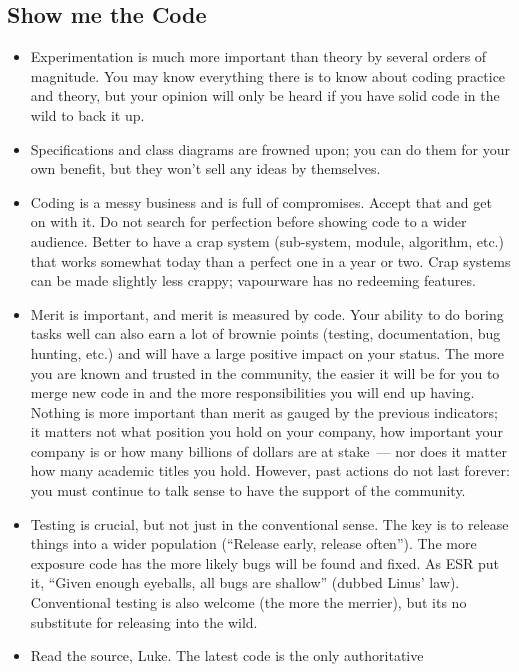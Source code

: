 \documentclass{memoir}
\begin{document}
\subsection{Show me the Code}

\begin{itemize}
\item Experimentation is much more important than theory by several
  orders of magnitude. You may know everything there is to know about
  coding practice and theory, but your opinion will only be heard if
  you have solid code in the wild to back it up.
\item Specifications and class diagrams are frowned upon; you can do
  them for your own benefit, but they won't sell any ideas by
  themselves.
\item Coding is a messy business and is full of compromises. Accept
  that and get on with it. Do not search for perfection before showing
  code to a wider audience. Better to have a crap system (sub-system,
  module, algorithm, etc.) that works somewhat today than a perfect
  one in a year or two. Crap systems can be made slightly less crappy;
  vapourware has no redeeming features.
\item Merit is important, and merit is measured by code. Your ability
  to do boring tasks well can also earn a lot of brownie points
  (testing, documentation, bug hunting, etc.) and will have a large
  positive impact on your status. The more you are known and trusted
  in the community, the easier it will be for you to merge new code in
  and the more responsibilities you will end up having. Nothing is
  more important than merit as gauged by the previous indicators; it
  matters not what position you hold on your company, how important
  your company is or how many billions of dollars are at stake~--- nor
  does it matter how many academic titles you hold. However, past
  actions do not last forever: you must continue to talk sense to have
  the support of the community.
\item Testing is crucial, but not just in the conventional sense. The
  key is to release things into a wider population (``Release early,
  release often''). The more exposure code has the more likely bugs
  will be found and fixed. As ESR put it, ``Given enough eyeballs, all
  bugs are shallow'' (dubbed Linus' law). Conventional testing is also
  welcome (the more the merrier), but its no substitute for releasing
  into the wild.
\item Read the source, Luke. The latest code is the only authoritative

\end{itemize}
\end{document}
